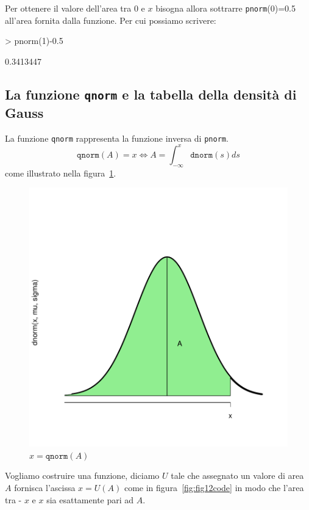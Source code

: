 \documentclass[onecolumn,12pt]{book}
\begin{document}
Per ottenere il valore dell'area tra 0 e $x$ bisogna allora sottrarre \texttt{pnorm}(0)=0.5 all'area fornita dalla funzione.
Per cui possiamo scrivere:
\begin{Schunk}
\begin{Sinput}
> pnorm(1)-0.5
\end{Sinput}
\begin{Soutput}
[1] 0.3413447
\end{Soutput}
\end{Schunk}


\subsection{La funzione \texttt{qnorm} e la tabella della densit\`a di Gauss}

La funzione \texttt{qnorm} rappresenta la funzione inversa di \texttt{pnorm}.
\[\texttt{qnorm}(A)=x\Leftrightarrow A=\int_{-\infty}^x \texttt{dnorm}(s)ds\] 
come illustrato nella figura~\ref{fig:fig2code}.
\begin{center}
\begin{figure}[H]
\includegraphics{RbookParte2-072}
\caption{$x=\texttt{qnorm}(A)$}
\label{fig:fig2code}
\end{figure}
\end{center}
Vogliamo costruire una funzione, diciamo $U$ tale che assegnato un valore di area $A$   fornisca l'ascissa $x=U(A)$ come in figura~\ref{fig:fig12code} in modo che l'area tra - $x$ e $x$ sia esattamente pari ad $A$.  
\end{document}
